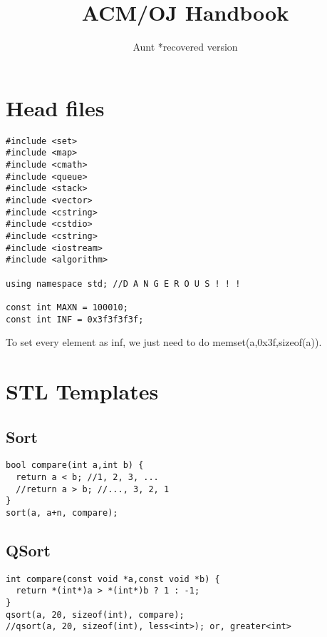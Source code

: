 \documentclass[11pt, a5paper, UTF8]{article}
\title{\textsf{ACM/OJ Handbook}}
\author{\textsf{Aunt *recovered version}}
\date{}
\begin{document}
\maketitle
\tableofcontents
\newpage

\section*{Head files}
\begin{lstlisting}
#include <set>
#include <map>
#include <cmath>
#include <queue>
#include <stack>
#include <vector>
#include <cstring>
#include <cstdio>
#include <cstring>
#include <iostream>
#include <algorithm>

using namespace std; //D A N G E R O U S ! ! !

const int MAXN = 100010;
const int INF = 0x3f3f3f3f;
\end{lstlisting}
	To set every element as inf, we just need to do memset(a,0x3f,sizeof(a)). \\

\section{STL Templates}

\subsection{Sort}
\begin{lstlisting}
bool compare(int a,int b) {
  return a < b; //1, 2, 3, ...
  //return a > b; //..., 3, 2, 1
}
sort(a, a+n, compare);
\end{lstlisting}
\subsection{QSort}
\begin{lstlisting}
int compare(const void *a,const void *b) {
  return *(int*)a > *(int*)b ? 1 : -1;   
}
qsort(a, 20, sizeof(int), compare);
//qsort(a, 20, sizeof(int), less<int>); or, greater<int>
\end{lstlisting}
\end{document}
